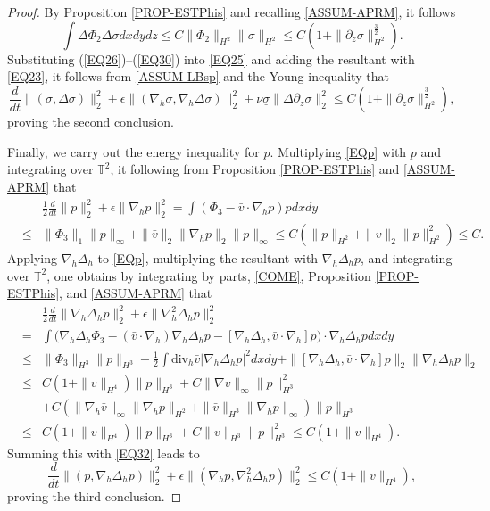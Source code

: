 \documentclass[10pt,a4paper]{amsart}
\begin{document}
\begin{proof}
By Proposition \ref{PROP-ESTPhis} and recalling \eqref{ASSUM-APRM}, it follows
\begin{equation}
  \int\Delta\Phi_2\Delta\sigma dxdydz\leq C\|\Phi_2\|_{H^2}\|\sigma\|_{H^2}\leq C\left(1+\|\partial_z\sigma\|_{H^2}^\frac32\right). \label{EQ30}
\end{equation}
Substituting (\ref{EQ26})--(\ref{EQ30}) into \eqref{EQ25} and adding the resultant with \eqref{EQ23}, it follows from
\eqref{ASSUM-LBsp} and the Young inequality that
\begin{equation}
  \frac{d}{dt}\|(\sigma,\Delta\sigma)\|_2^2+\epsilon\|(\nabla_h\sigma,\nabla_h\Delta\sigma)\|_2^2
  +\nu\underline\sigma\|\Delta\partial_z\sigma\|_2^2\leq C\left(1+\|\partial_z\sigma\|_{H^2}^\frac32\right), \label{EQ31}
\end{equation}
proving the second conclusion.

Finally, we carry out the energy inequality for $p$. Multiplying \eqref{EQp} with $p$ and integrating over $\mathbb T^2$, it following from
Proposition \ref{PROP-ESTPhis} and \eqref{ASSUM-APRM} that
\begin{eqnarray}
  &&\frac12\frac{d}{dt}\|p\|_2^2+\epsilon\|\nabla_hp\|_2^2= \int(\Phi_3-\bar v\cdot\nabla_hp)pdxdy\nonumber
  \\
  &\leq& \|\Phi_3\|_1\|p\|_\infty+\|\bar v\|_2\|\nabla_hp\|_2\|p\|_\infty\leq C(\|p\|_{H^2}+\|v\|_2\|p\|_{H^2}^2)\leq C.
  \label{EQ32}
\end{eqnarray}
Applying $\nabla_h\Delta_h$ to \eqref{EQp}, multiplying the resultant with $\nabla_h\Delta_hp$, and integrating over $\mathbb T^2$, one
obtains by integrating by parts, \eqref{COME}, Proposition \ref{PROP-ESTPhis}, and \eqref{ASSUM-APRM} that
\begin{eqnarray*}
  &&\frac12\frac{d}{dt}\|\nabla_h\Delta_hp\|_2^2+\epsilon\|\nabla_h^2\Delta_hp\|_2^2\nonumber\\
  &=&\int\Big(\nabla_h\Delta_h\Phi_3-(\bar v\cdot\nabla_h)\nabla_h\Delta_hp-[\nabla_h\Delta_h,\bar v\cdot\nabla_h]p\Big)\cdot\nabla_h\Delta_hpdxdy \nonumber\\
  &\leq&\|\Phi_3\|_{H^3}\|p\|_{H^3}+\frac12\int\text{div}_h\bar v|\nabla_h\Delta_hp|^2dxdy+\|[\nabla_h\Delta_h,\bar v\cdot\nabla_h]p\|_2\|\nabla_h\Delta_h
  p\|_2\nonumber\\
  &\leq&C(1+\|v\|_{H^4})\|p\|_{H^3}+C\|\nabla v\|_\infty\|p\|_{H^3}^2\nonumber\\
  &&+C(\|\nabla_h\bar v\|_\infty\|\nabla_hp\|_{H^2}+\|\bar v\|_{H^3}\|\nabla_hp\|_\infty)\|p\|_{H^3}\nonumber\\
  &\leq&C(1+\|v\|_{H^4})\|p\|_{H^3}+C\|v\|_{H^3}\|p\|_{H^3}^2\leq C(1+\|v\|_{H^4}).
\end{eqnarray*}
Summing this with \eqref{EQ32} leads to
\begin{equation}
  \frac{d}{dt}\|(p,\nabla_h\Delta_hp)\|_2^2+\epsilon\|(\nabla_hp,\nabla_h^2\Delta_hp)\|_2^2
  \leq C(1+\|v\|_{H^4}),\label{EQ33}
\end{equation}
proving the third conclusion.
\end{proof}
\end{document}

